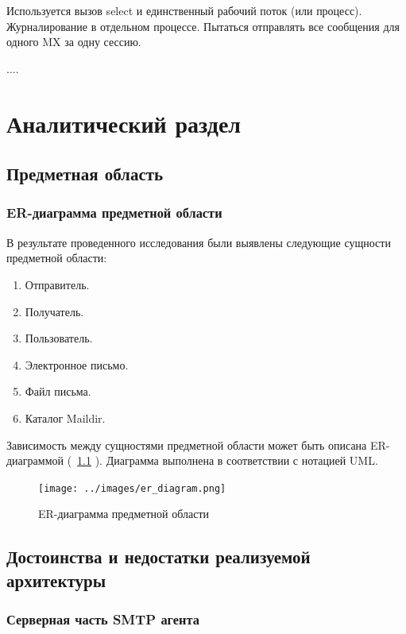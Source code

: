 \documentclass[a4paper,12pt]{report}
\begin{document}
Используется вызов select и единственный рабочий поток (или процесс). Журналирование в отдельном процессе. Пытаться отправлять все сообщения для одного MX за одну сессию.

.... %

\chapter{Аналитический раздел}

\section*{Предметная область}

\subsection*{ER-диаграмма предметной области}

В результате проведенного исследования были выявлены следующие сущности предметной области:

\begin{enumerate}
    \item Отправитель.
    \item Получатель.
    \item Пользователь.
    \item Электронное письмо.
    \item Файл письма.
    \item Каталог Maildir.
\end{enumerate}

Зависимость между сущностями предметной области может быть описана ER-диаграммой (~\ref{fig:er_diagram} ). Диаграмма выполнена в соответствии с нотацией UML.
\begin{figure}
    \centering
    \texttt{[image: ../images/er\_diagram.png]}
    \caption{ER-диаграмма предметной области}
    \label{fig:er_diagram}
\end{figure}


\section*{Достоинства и недостатки реализуемой архитектуры}

\subsection*{Серверная часть SMTP агента}
\end{document}
